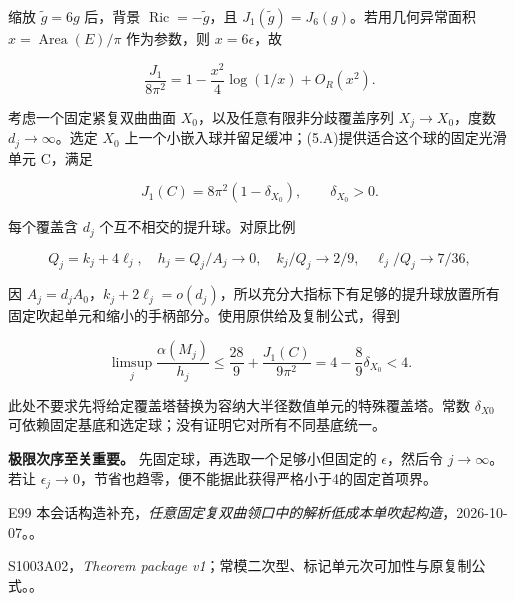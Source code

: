 \documentclass[UTF8,11pt,fontset=none]{ctexart}
\theoremstyle{definition}
\theoremstyle{remark}
\begin{document}
缩放 \(\widetilde g=6g\) 后，背景 \(\operatorname{Ric}=-\widetilde g\)，且 \(J_1(\widetilde g)=J_6(g)\)。若用几何异常面积 \(x=\operatorname{Area}(E)/\pi\) 作为参数，则 \(x=6\epsilon\)，故

\[
\frac{J_1}{8\pi^2}
=1-\frac{x^2}{4}\log(1/x)+O_R(x^2).
\]

考虑一个固定紧复双曲曲面 \(X_0\)，以及任意有限非分歧覆盖序列 \(X_j\to X_0\)，度数 \(d_j\to \infty\)。选定 \(X_0\) 上一个小嵌入球并留足缓冲；(5.A)提供适合这个球的固定光滑单元 C，满足

\[
 J_1(C)=8\pi^2(1-\delta_{X_0}),\qquad\delta_{X_0}>0.
\]

每个覆盖含 \(d_j\) 个互不相交的提升球。对原比例

\[
 Q_j=k_j+4\ell_j,\quad h_j=Q_j/A_j\to0,\quad
 k_j/Q_j\to2/9,\quad \ell_j/Q_j\to7/36,
\]

因 \(A_j=d_jA_0\)，\(k_j+2\ell _j=o(d_j)\)，所以充分大指标下有足够的提升球放置所有固定吹起单元和缩小的手柄部分。使用原供给及复制公式，得到

\[
\boxed{
\limsup_j\frac{\alpha(M_j)}{h_j}
\le\frac{28}{9}+\frac{J_1(C)}{9\pi^2}
=4-\frac89\delta_{X_0}<4.
}
\tag{5.6.1}
\]

此处不要求先将给定覆盖塔替换为容纳大半径数值单元的特殊覆盖塔。常数 \(\delta _{X0}\) 可依赖固定基底和选定球；没有证明它对所有不同基底统一。

\textbf{极限次序至关重要。} 先固定球，再选取一个足够小但固定的 \(\epsilon\)，然后令 \(j\to \infty\)。若让 \(\epsilon _j\to 0\)，节省也趋零，便不能据此获得严格小于4的固定首项界。

\begin{thebibliography}{E99}
\small
{} 本会话构造补充，\emph{任意固定复双曲领口中的解析低成本单吹起构造}，2026-10-07。。

 S1003A02，\emph{Theorem package v1}；常模二次型、标记单元次可加性与原复制公式。。

\end{thebibliography}
\end{document}
